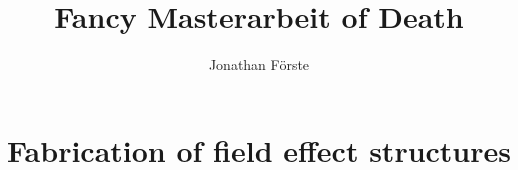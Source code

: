 \documentclass{scrbook}
\title{Fancy Masterarbeit of Death}
\author{Jonathan Förste}
\begin{document}
\maketitle
\tableofcontents


\chapter{Fabrication of field effect structures}\label{exfoliation}
	


\printbibliography
\end{document}
